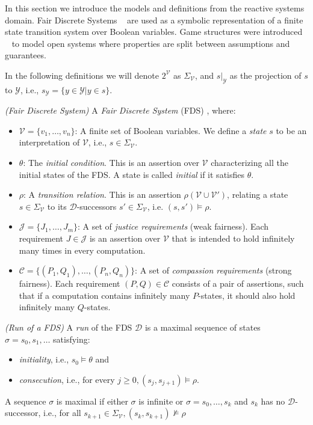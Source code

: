 
In this section we introduce the models and definitions from the reactive systems domain. Fair Discrete Systems ~\cite{kesten2000verification} are used as a symbolic representation of a finite state transition system over Boolean variables. Game structures were introduced ~\cite{bloem2012synthesis} to model open systems where properties are split between assumptions and guarantees.

In the following definitions we will denote $2^{\mathcal{V}}$ as $\Sigma_{\mathcal{V}}$, and $s|_{\mathcal{Y}}$ as the projection of $s$ to $\mathcal{Y}$, i.e., $s_{\mathcal{Y}} = \{y \in \mathcal{Y} | y \in s \}$.

\begin{definition}
	\label{def:FDS} \emph{(Fair Discrete System)} 
	A \emph{Fair Discrete System} (FDS) \fdsDef, where:
	\begin{itemize}
		\item $\mathcal{V} = \{v_1,\ldots,v_n \}$: A finite set of Boolean variables. We define a \emph{state} $s$ to be an interpretation of $\mathcal{V}$, i.e., $s \in \Sigma_{\mathcal{V}}$.
		\item $\theta$: The \emph{initial condition}. This is an assertion over $\mathcal{V}$ characterizing all the initial states of the FDS. A state is called \emph{initial} if it satisfies $\theta$.
		\item $\rho$: A \emph{transition relation}. This is an assertion $\rho(\mathcal{V} \cup \mathcal{V}')$, relating a state $s \in \Sigma_{\mathcal{V}}$ to its $\mathcal{D}$-successors $s' \in \Sigma_{\mathcal{V}}$, i.e. $(s,s') \models \rho$.
		\item $\mathcal{J} = \{J_1, \ldots, J_m \}$: A set of \emph{justice requirements} (weak fairness). Each requirement $J \in \mathcal{J}$ is an assertion over $\mathcal{V}$ that is intended to hold infinitely many times in every computation.
		\item $\mathcal{C} = \{(P_1,Q_1), \ldots, (P_n,Q_n) \}$: A set of \emph{compassion requirements} (strong fairness). Each requirement $(P,Q) \in \mathcal{C}$ consists of a pair of assertions, such that if a computation contains infinitely many $P$-states, it should also hold infinitely many $Q$-states.
	\end{itemize}
\end{definition}

\begin{definition}
	\label{def:runFDS} \emph{(Run of a FDS)} 
	A \emph{run} of the FDS $\mathcal{D}$ is a maximal sequence of states $\sigma = s_0,s_1,\ldots$
	satisfying:
	\begin{itemize}
		\item \emph{initiality}, i.e., $s_0\models \theta$ and
		\item \emph{consecution}, i.e., for every $j\geq 0, (s_j, s_{j+1})\models \rho$.
	\end{itemize}
	A sequence $\sigma$ is maximal if either $\sigma$ is infinite or $\sigma=s_0,\ldots,s_k$ and $s_k$ has no $\mathcal{D}$-successor, i.e., for all $s_{k+1} \in \Sigma_{\mathcal{V}}, (s_k,s_{k+1}) \not\models \rho$
\end{definition}



